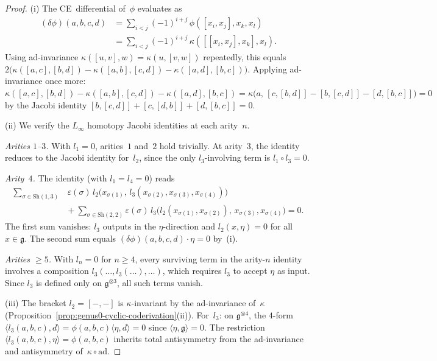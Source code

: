 \begin{proof}
(i)\enspace
The CE~differential of~$\phi$ evaluates as
\begin{align*}
(\delta\phi)(a,b,c,d)
&= \textstyle\sum_{i<j}(-1)^{i+j}\,
  \phi([x_i,x_j],x_k,x_l) \\
&= \textstyle\sum_{i<j}(-1)^{i+j}\,
  \kappa([[x_i,x_j],x_k],x_l).
\end{align*}
Using ad-invariance $\kappa([u,v],w) = \kappa(u,[v,w])$
repeatedly, this equals
$2\bigl(\kappa([a,c],[b,d]) - \kappa([a,b],[c,d])
  - \kappa([a,d],[b,c])\bigr)$.
Applying ad-invariance once more:
$\kappa([a,c],[b,d]) - \kappa([a,b],[c,d])
  - \kappa([a,d],[b,c])
= \kappa\bigl(a,\,
  [c,[b,d]] - [b,[c,d]] - [d,[b,c]]\bigr) = 0$
by the Jacobi identity $[b,[c,d]] + [c,[d,b]] + [d,[b,c]] = 0$.

(ii)\enspace
We verify the $L_\infty$ homotopy Jacobi identities at
each arity~$n$.

\emph{Arities $1$--$3$.}
With $l_1 = 0$, arities~$1$ and~$2$ hold trivially.
At arity~$3$, the identity reduces to the Jacobi identity
for~$l_2$, since the only $l_3$-involving term is
$l_1\circ l_3 = 0$.

\emph{Arity~$4$.}
The identity (with $l_1 = l_4 = 0$) reads
\begin{equation}\label{eq:arity4-linf}
\begin{split}
\textstyle\sum_{\sigma \in \mathrm{Sh}(1,3)}
  &\,\varepsilon(\sigma)\,l_2\bigl(x_{\sigma(1)},\,
  l_3(x_{\sigma(2)},x_{\sigma(3)},x_{\sigma(4)})\bigr)\\
&{}+ \textstyle\sum_{\sigma \in \mathrm{Sh}(2,2)}
  \varepsilon(\sigma)\,l_3\bigl(l_2(x_{\sigma(1)},
  x_{\sigma(2)}),\,x_{\sigma(3)},x_{\sigma(4)}\bigr) = 0.
\end{split}
\end{equation}
The first sum vanishes: $l_3$ outputs in the
$\eta$-direction and $l_2(x,\eta) = 0$ for all
$x \in \mathfrak{g}$.  The second sum equals
$(\delta\phi)(a,b,c,d)\cdot\eta = 0$ by~(i).

\emph{Arities $\geq 5$.}
With $l_n = 0$ for $n \geq 4$, every surviving term in the
arity-$n$ identity involves a composition
$l_3(\dots, l_3(\dots), \dots)$, which requires $l_3$ to
accept $\eta$ as input.  Since $l_3$ is defined only on
$\mathfrak{g}^{\otimes 3}$, all such terms vanish.

(iii)\enspace
The bracket $l_2 = [-,-]$ is $\kappa$-invariant by the
ad-invariance of~$\kappa$
(Proposition~\ref{prop:genus0-cyclic-coderivation}(ii)).
For~$l_3$: on $\mathfrak{g}^{\otimes 4}$, the $4$-form
$\langle l_3(a,b,c),d\rangle = \phi(a,b,c)\langle\eta,d\rangle
= 0$ since $\langle\eta,\mathfrak{g}\rangle = 0$.
The restriction
$\langle l_3(a,b,c),\eta\rangle = \phi(a,b,c)$ inherits total
antisymmetry from the ad-invariance and antisymmetry
of~$\kappa\circ\mathrm{ad}$.
\end{proof}

